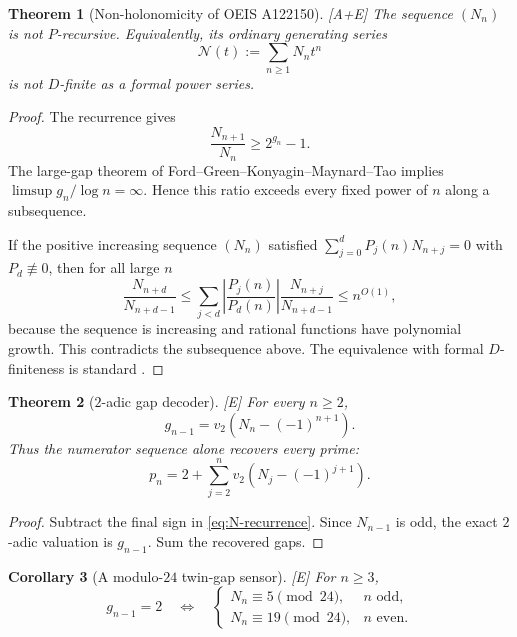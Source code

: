 \documentclass[11pt]{article}
\newtheorem{theorem}{Theorem}[section]
\newtheorem{corollary}[theorem]{Corollary}
\theoremstyle{definition}
\theoremstyle{remark}
\newcommand{\status}[1]{\textnormal{\textcolor{accent}{\footnotesize[#1]}}}
\begin{document}
\begin{theorem}[Non-holonomicity of OEIS A122150]
\label{thm:N-not-P-recursive}
\status{A+E}
The sequence $(N_n)$ is not $P$-recursive.  Equivalently, its ordinary generating
series
\[
 \mathcal N(t):=\sum_{n\ge1}N_nt^n
\]
is not $D$-finite as a formal power series.
\end{theorem}

\begin{proof}
The recurrence gives
\[
 \frac{N_{n+1}}{N_n}\ge2^{g_n}-1.
\]
The large-gap theorem of Ford--Green--Konyagin--Maynard--Tao \cite{FGKMT} implies
$\limsup g_n/\log n=\infty$.  Hence this ratio exceeds every fixed power of $n$
along a subsequence.

If the positive increasing sequence $(N_n)$ satisfied
$\sum_{j=0}^{d}P_j(n)N_{n+j}=0$ with $P_d\not\equiv0$, then for all large $n$
\[
 \frac{N_{n+d}}{N_{n+d-1}}
 \le\sum_{j<d}\left|\frac{P_j(n)}{P_d(n)}\right|
       \frac{N_{n+j}}{N_{n+d-1}}
 \le n^{O(1)},
\]
because the sequence is increasing and rational functions have polynomial growth.
This contradicts the subsequence above.  The equivalence with formal $D$-finiteness is
standard \cite{Stanley}.
\end{proof}

\begin{theorem}[$2$-adic gap decoder]\label{thm:2adic-decoder}
\status{E}
For every $n\ge2$,
\begin{equation}\label{eq:2adic-decoder}
 g_{n-1}=v_2\!\left(N_n-(-1)^{n+1}\right).
\end{equation}
Thus the numerator sequence alone recovers every prime:
\begin{equation}\label{eq:prime-from-N}
 p_n=2+\sum_{j=2}^{n}
 v_2\!\left(N_j-(-1)^{j+1}\right).
\end{equation}
\end{theorem}

\begin{proof}
Subtract the final sign in \eqref{eq:N-recurrence}.  Since $N_{n-1}$ is odd, the exact
$2$-adic valuation is $g_{n-1}$.  Sum the recovered gaps.
\end{proof}

\begin{corollary}[A modulo-$24$ twin-gap sensor]\label{cor:mod24-sensor}
\status{E}
For $n\ge3$,
\begin{equation}\label{eq:mod24-sensor}
 g_{n-1}=2\quad\Longleftrightarrow\quad
 \begin{cases}
  N_n\equiv5\pmod{24},&n\text{ odd},\\
  N_n\equiv19\pmod{24},&n\text{ even}.
 \end{cases}
\end{equation}
\end{corollary}
\end{document}
